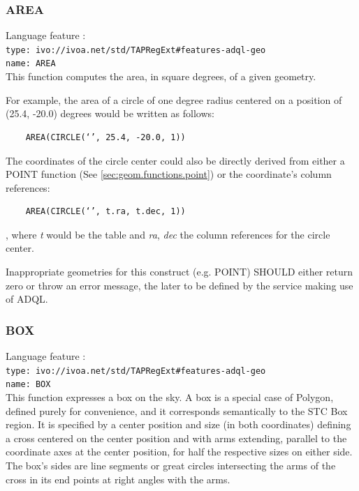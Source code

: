 \documentclass[11pt,a4paper]{ivoa}
\begin{document}
\subsubsection{AREA}
\label{sec:geom.functions.area}
{\footnotesize Language feature :}\\
{\footnotesize \verb|type: ivo://ivoa.net/std/TAPRegExt#features-adql-geo|}\\
{\footnotesize \verb|name: AREA|}\\

This function computes the area, in square degrees, of a given geometry.

For example, the area of a circle of one degree radius centered on a position
of (25.4, -20.0) degrees would be written as follows:

\begin{verbatim}
    AREA(CIRCLE(‘’, 25.4, -20.0, 1))
\end{verbatim}

The coordinates of the circle center could also be directly derived from
either a POINT function (See \ref{sec:geom.functions.point}) or
the coordinate’s column references:

\begin{verbatim}
    AREA(CIRCLE(‘’, t.ra, t.dec, 1))
\end{verbatim}

, where \textit{t} would be the table and \textit{ra}, \textit{dec} the
column references for the circle center.

Inappropriate geometries for this construct (e.g. POINT) SHOULD either return
zero or throw an error message, the later to be defined by the service making
use of ADQL.

\subsubsection{BOX}
\label{sec:geom.functions.box}
{\footnotesize Language feature :}\\
{\footnotesize \verb|type: ivo://ivoa.net/std/TAPRegExt#features-adql-geo|}\\
{\footnotesize \verb|name: BOX|}\\

This function expresses a box on the sky. A box is a special case of Polygon,
defined purely for convenience, and it corresponds semantically to the STC Box
region. It is specified by a center position and size
(in both coordinates) defining a cross centered on the center position and
with arms extending, parallel to the coordinate axes at the center position,
for half the respective sizes on either side. The box’s sides are line
segments or great circles intersecting the arms of the cross in its end
points at right angles with the arms.
\end{document}
